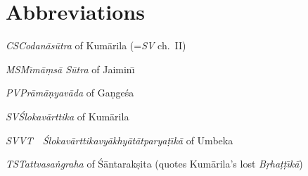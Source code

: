 ﻿\documentclass[11pt]{amsart}
\newcommand{\tab}{\hspace*{1em}}
\begin{document}























\small

\section*{Abbreviations}

\noindent\emph{CS}\tab\tab\tab \emph{Codan\=as\=utra} of Kum\=arila (=\emph{SV} ch.~II)

\noindent\emph{MS}\tab\tab\tab \emph{M\={\i}m\=a\d ms\=a S\=utra} of Jaimin\={\i}

\noindent\emph{PV}\tab\tab\tab \emph{Pr\=am\=a\d nyav\=ada} of Ga\d nge\'sa

\noindent\emph{SV}\tab\tab\tab \emph{\small\'S\normalsize lokav\=arttika} of Kum\=arila

\noindent\emph{SVVT}\tab\ \ \emph{\small\'S\normalsize lokav\=arttikavy\=akhy\=at\=atparya\d t\={\i}k\=a} of Umbeka

\noindent\emph{TS}\tab\tab\tab \emph{Tattvasa\.ngraha} of \'S\=antarak\d sita (quotes Kum\=arila's lost \emph{B\d rha\d t\d t\={\i}k\=a})



\end{document}
